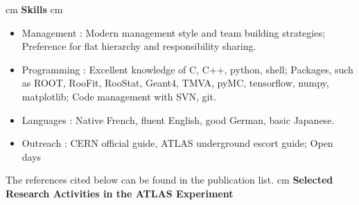 \documentclass[12pt]{article}
\begin{document}
 cm
{\bf \large Skills}
 cm
\TabPositions{3.2cm}
\begin{itemize}
\itemsep0.3em
\item[] Management : Modern management style and team building strategies;
  Preference for flat hierarchy and responsibility sharing.
\item[] Programming : Excellent knowledge of C, C++, python, shell;
  Packages, such as ROOT, RooFit, RooStat, Geant4, TMVA, pyMC, 
 tensorflow, numpy, matplotlib;
  Code management with SVN, git.
 \item[] Languages : Native French, fluent English, good German, basic Japanese.
 \item[] Outreach : CERN official guide, ATLAS underground escort guide; Open days

\end{itemize}

\newpage

The references cited below can be found in the publication list.
 cm
{\bf \Large Selected Research Activities in the ATLAS Experiment}
\vskip 0.4cm
\end{document}
